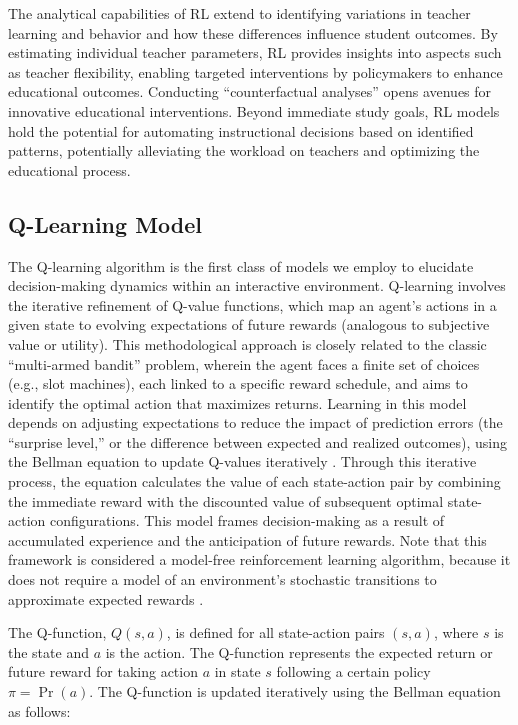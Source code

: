 \documentclass[
  number,
  preprint,
  3p,
  onecolumn]{elsarticle}
\begin{document}
The analytical capabilities of RL extend to identifying variations in
teacher learning and behavior and how these differences influence
student outcomes. By estimating individual teacher parameters, RL
provides insights into aspects such as teacher flexibility, enabling
targeted interventions by policymakers to enhance educational outcomes.
Conducting ``counterfactual analyses'' opens avenues for innovative
educational interventions. Beyond immediate study goals, RL models hold
the potential for automating instructional decisions based on identified
patterns, potentially alleviating the workload on teachers and
optimizing the educational process.

\subsection{Q-Learning Model}\label{q-learning-model}

The Q-learning algorithm is the first class of models we employ to
elucidate decision-making dynamics within an interactive environment.
Q-learning involves the iterative refinement of Q-value functions, which
map an agent's actions in a given state to evolving expectations of
future rewards (analogous to subjective value or utility). This
methodological approach is closely related to the classic ``multi-armed
bandit'' problem, wherein the agent faces a finite set of choices (e.g.,
slot machines), each linked to a specific reward schedule, and aims to
identify the optimal action that maximizes returns. Learning in this
model depends on adjusting expectations to reduce the impact of
prediction errors (the ``surprise level,'' or the difference between
expected and realized outcomes), using the Bellman equation to update
Q-values iteratively \citep{rummery}. Through this iterative process,
the equation calculates the value of each state-action pair by combining
the immediate reward with the discounted value of subsequent optimal
state-action configurations. This model frames decision-making as a
result of accumulated experience and the anticipation of future rewards.
Note that this framework is considered a model-free reinforcement
learning algorithm, because it does not require a model of an
environment's stochastic transitions to approximate expected rewards
\citep{watkins1992}.

The Q-function, \(Q(s, a)\), is defined for all state-action pairs
\((s, a)\), where \(s\) is the state and \(a\) is the action. The
Q-function represents the expected return or future reward for taking
action \(a\) in state \(s\) following a certain policy \(\pi = \Pr(a)\).
The Q-function is updated iteratively using the Bellman equation as
follows:
\end{document}
